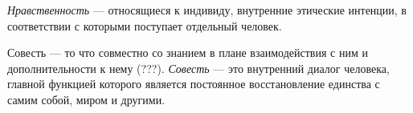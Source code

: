 \textit{Нравственность} --- относящиеся к  индивиду, внутренние этические интенции, в соответствии с которыми поступает отдельный человек.


Совесть --- то что совместно со знанием в плане взаимодействия с ним и дополнительности к нему (???). \textit{Совесть} --- это внутренний диалог человека, главной функцией которого является постоянное восстановление единства с самим собой, миром и другими.

